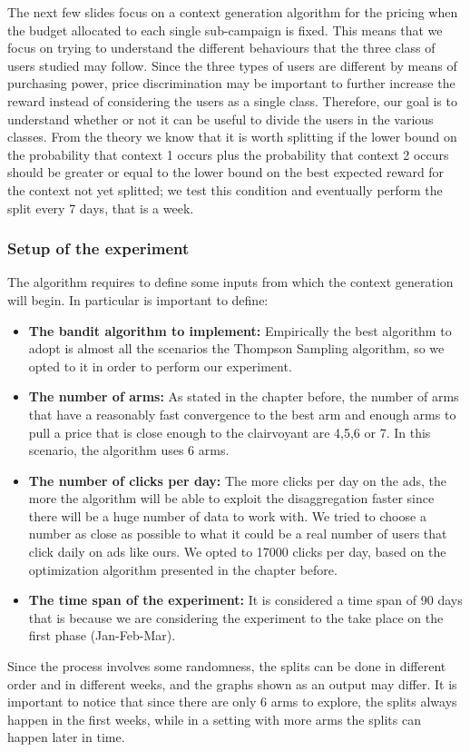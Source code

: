 The next few slides focus on a context generation algorithm for the pricing when the budget allocated to each single sub-campaign is fixed. This means that we focus on trying to understand the different behaviours that the three class of users studied may follow. Since the three types of users are different by means of purchasing power, price discrimination may be important to further increase the reward instead of considering the users as a single class. Therefore, our goal is to understand whether or not it can be useful to divide the users in the various classes. From the theory we know that it is worth splitting if the lower bound on the probability that context 1 occurs plus the probability that context 2 occurs should be greater or equal to the lower bound on the best expected reward for the context not yet splitted; we test this condition and eventually perform the split every 7 days, that is a week.
\subsubsection{Setup of the experiment}
The algorithm requires to define some inputs from which the context generation will begin. In particular is important to define:
\begin{itemize}
	\item \textbf{The bandit algorithm to implement:} Empirically the best algorithm to adopt is almost all the scenarios the Thompson Sampling algorithm, so we opted to it in order to perform our experiment.
	\item \textbf{The number of arms:} As stated in the chapter before, the number of arms that have a reasonably fast convergence to the best arm and enough arms to pull a price that is close enough to the clairvoyant are 4,5,6 or 7. In this scenario, the algorithm uses 6 arms.
	\item \textbf{The number of clicks per day:} The more clicks per day on the ads, the more the algorithm will be able to exploit the disaggregation faster since there will be a huge number of data to work with. We tried to choose a number as close as possible to what it could be a real number of users that click daily on ads like ours. We opted to 17000 clicks per day, based on the  optimization algorithm presented in the chapter before.
	\item \textbf{The time span of the experiment:} It is considered a time span of 90 days that is because we are considering the experiment to the take place on the first phase (Jan-Feb-Mar).
\end{itemize}
Since the process involves some randomness, the splits can be done in different order and in different weeks, and the graphs shown as an output may differ. It is important to notice that since there are only 6 arms to explore, the splits always happen in the first weeks, while in a setting with more arms the splits can happen later in time.
